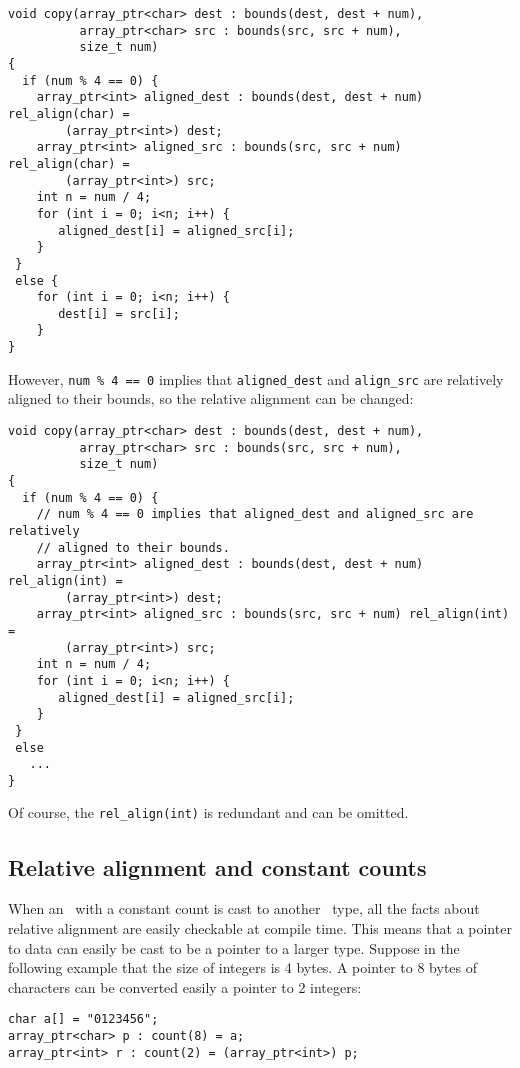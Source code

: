 \begin{verbatim}
void copy(array_ptr<char> dest : bounds(dest, dest + num),
          array_ptr<char> src : bounds(src, src + num), 
          size_t num)
{
  if (num % 4 == 0) {
    array_ptr<int> aligned_dest : bounds(dest, dest + num) rel_align(char) =
        (array_ptr<int>) dest;
    array_ptr<int> aligned_src : bounds(src, src + num) rel_align(char) =
        (array_ptr<int>) src;
    int n = num / 4;
    for (int i = 0; i<n; i++) {
       aligned_dest[i] = aligned_src[i];
    }
 }
 else {
    for (int i = 0; i<n; i++) {
       dest[i] = src[i];
    }
}
\end{verbatim}

However, \texttt{num \% 4 == 0} implies that \texttt{aligned\_dest} and
\texttt{align\_src} are relatively aligned to their bounds, so the
relative alignment can be changed:

\begin{verbatim}
void copy(array_ptr<char> dest : bounds(dest, dest + num),
          array_ptr<char> src : bounds(src, src + num), 
          size_t num)
{
  if (num % 4 == 0) {
    // num % 4 == 0 implies that aligned_dest and aligned_src are relatively
    // aligned to their bounds.
    array_ptr<int> aligned_dest : bounds(dest, dest + num) rel_align(int) =
        (array_ptr<int>) dest;
    array_ptr<int> aligned_src : bounds(src, src + num) rel_align(int) =
        (array_ptr<int>) src;
    int n = num / 4;
    for (int i = 0; i<n; i++) {
       aligned_dest[i] = aligned_src[i];
    }
 }
 else  
   ...
}
\end{verbatim}

Of course, the \texttt{rel\_align(int)} is redundant and can be omitted.

\subsection{Relative alignment and constant counts}

When an \arrayptr\ with a constant count is cast to another
\arrayptr\ type, all the facts about relative alignment are
easily checkable at compile time. This means that a pointer to data can
easily be cast to be a pointer to a larger type. Suppose in the
following example that the size of integers is 4 bytes. A pointer to 8
bytes of characters can be converted easily a pointer to 2 integers:

\begin{verbatim}
char a[] = "0123456";
array_ptr<char> p : count(8) = a;
array_ptr<int> r : count(2) = (array_ptr<int>) p;
\end{verbatim}

